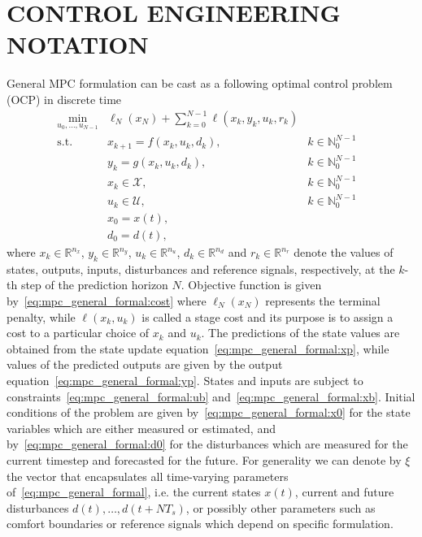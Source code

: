 \documentclass[10pt]{extarticle}
\begin{document}
\section{CONTROL ENGINEERING NOTATION}

General MPC formulation can be cast as a following optimal control problem (OCP) in discrete time
\begin{subequations}
	\label{eq:mpc_general_formal}
	\begin{align}
	\min_{u_0, \ldots, u_{N-1}} & \ell_N(x_N) + \sum_{k=0}^{N-1} \ell(x_k, y_k, u_k, r_k) &
	\label{eq:mpc_general_formal:cost}\\
	\text{s.t.} \ & x_{k+1} = f(x_k, u_k, d_k),  & k \in \mathbb{N}_{0}^{N-1} & \label{eq:mpc_general_formal:xp} \\
	& y_{k} = g(x_k, u_k, d_k),  & k \in \mathbb{N}_{0}^{N-1} & \label{eq:mpc_general_formal:yp} \\
	&  x_{k} \in \mathcal{X},  & k \in \mathbb{N}_{0}^{N-1}   \label{eq:mpc_general_formal:ub}\\
	& u_{k} \in \mathcal{U}, & k \in \mathbb{N}_{0}^{N-1} 
	\label{eq:mpc_general_formal:xb}\\
	& x_0 = x(t),\label{eq:mpc_general_formal:x0} \\
	& d_0 = d(t),\label{eq:mpc_general_formal:d0}
	\end{align}
\end{subequations}
where $x_k \in \mathbb{R}^{n_x}$, $y_k \in \mathbb{R}^{n_y}$, $u_k \in \mathbb{R}^{n_u}$, $d_k \in \mathbb{R}^{n_d}$ and $r_k \in \mathbb{R}^{n_r}$ denote the values of states, outputs,
inputs, disturbances and reference signals, respectively, at the $k$-th step of the prediction horizon $N$. 
Objective function is given by~\eqref{eq:mpc_general_formal:cost} where   $\ell_N(x_N)$  represents the terminal penalty,
while $\ell(x_k,u_k)$  is called a stage cost and its
purpose is to assign a cost to a particular choice of $x_k$ and
$u_k$.
The predictions of the state values are obtained from the state update equation~\eqref{eq:mpc_general_formal:xp}, while values of the predicted outputs are given by
the output equation~\eqref{eq:mpc_general_formal:yp}.
States and inputs are subject to
constraints~\eqref{eq:mpc_general_formal:ub} and~\eqref{eq:mpc_general_formal:xb}.
Initial conditions of the problem are given by~\eqref{eq:mpc_general_formal:x0} for the state variables which are either  measured or estimated, and by~\eqref{eq:mpc_general_formal:d0} for the disturbances which are measured for the current timestep and forecasted for the future.
For generality we can denote by $\xi$ the vector that encapsulates all time-varying parameters
of~\eqref{eq:mpc_general_formal}, i.e. the current states $x(t)$,
current and future disturbances $d(t), \ldots, d(t+N T_s)$, or possibly other parameters such as comfort boundaries or reference signals which depend on specific formulation.
\end{document}

